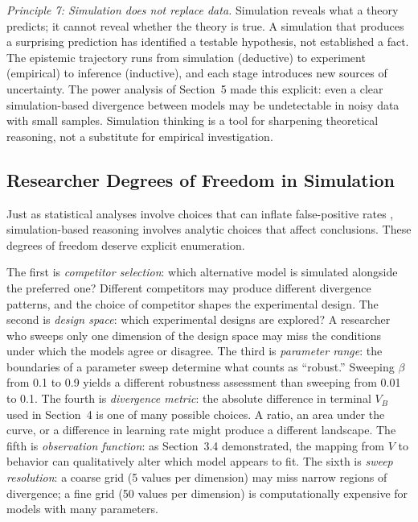 \documentclass[fleqn,10pt]{wlscirep}
\begin{document}
\begin{linenumbers}
\emph{Principle 7: Simulation does not replace data.} Simulation reveals what a theory predicts; it cannot reveal whether the theory is true. A simulation that produces a surprising prediction has identified a testable hypothesis, not established a fact. The epistemic trajectory runs from simulation (deductive) to experiment (empirical) to inference (inductive), and each stage introduces new sources of uncertainty. The power analysis of Section~5 made this explicit: even a clear simulation-based divergence between models may be undetectable in noisy data with small samples. Simulation thinking is a tool for sharpening theoretical reasoning, not a substitute for empirical investigation.

\subsection{Researcher Degrees of Freedom in Simulation}

Just as statistical analyses involve choices that can inflate false-positive rates \citep{simmons2011false}, simulation-based reasoning involves analytic choices that affect conclusions. These degrees of freedom deserve explicit enumeration.

The first is \emph{competitor selection}: which alternative model is simulated alongside the preferred one? Different competitors may produce different divergence patterns, and the choice of competitor shapes the experimental design. The second is \emph{design space}: which experimental designs are explored? A researcher who sweeps only one dimension of the design space may miss the conditions under which the models agree or disagree. The third is \emph{parameter range}: the boundaries of a parameter sweep determine what counts as ``robust.'' Sweeping $\beta$ from 0.1 to 0.9 yields a different robustness assessment than sweeping from 0.01 to 0.1. The fourth is \emph{divergence metric}: the absolute difference in terminal $V_B$ used in Section~4 is one of many possible choices. A ratio, an area under the curve, or a difference in learning rate might produce a different landscape. The fifth is \emph{observation function}: as Section~3.4 demonstrated, the mapping from $V$ to behavior can qualitatively alter which model appears to fit. The sixth is \emph{sweep resolution}: a coarse grid (5 values per dimension) may miss narrow regions of divergence; a fine grid (50 values per dimension) is computationally expensive for models with many parameters.


\end{linenumbers}
\end{document}
